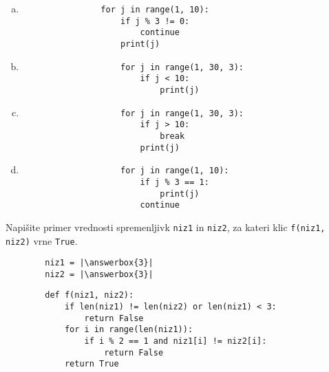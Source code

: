 \documentclass[arhiv, 10pt]{../izpit}
\newcommand{\inlinepy}[1]{\texttt{#1}}
\newcommand{\answerbox}[1]{\framebox{\vphantom{\large M}\hspace{#1cm}}}
\begin{document}
        \begin{multicols}{2}
        \begin{enumerate}[(a)]
\item 
            \begin{verbatim}
                for j in range(1, 10):
                    if j % 3 != 0:
                        continue
                    print(j)
            \end{verbatim}
        
\item 
                \begin{verbatim}
                    for j in range(1, 30, 3):
                        if j < 10:
                            print(j)
                \end{verbatim}
            
\item 
                \begin{verbatim}
                    for j in range(1, 30, 3):
                        if j > 10:
                            break
                        print(j)
                \end{verbatim}
            
\item 
                \begin{verbatim}
                    for j in range(1, 10):
                        if j % 3 == 1:
                            print(j)
                        continue
                \end{verbatim}
            
\end{enumerate}

        \end{multicols}
    
        \naloga*
        \begin{multicols}{2}
        \noindent
        Napišite primer vrednosti spremenljivk \inlinepy{niz1} in \inlinepy{niz2}, za kateri klic \inlinepy{f(niz1, niz2)} vrne \inlinepy{True}.
        \begin{verbatim}
        niz1 = |\answerbox{3}|
        niz2 = |\answerbox{3}|
        \end{verbatim}
        \vfil
        \columnbreak
        \begin{verbatim}
        def f(niz1, niz2):
            if len(niz1) != len(niz2) or len(niz1) < 3:
                return False
            for i in range(len(niz1)):
                if i % 2 == 1 and niz1[i] != niz2[i]:
                    return False
            return True
        \end{verbatim}
        \end{multicols}
    
\end{document}
